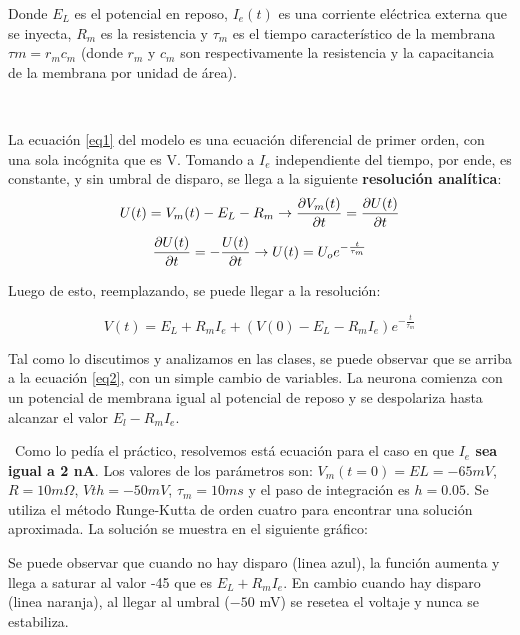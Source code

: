 \documentclass{article}
\begin{document}
Donde $E_{L}$ es el potencial en reposo, $I_{e}(t)$ es una corriente eléctrica externa que se inyecta, $R_{m}$ es la resistencia y $\tau_{m}$ es el tiempo característico de la membrana $τm = r_{m} c_{m}$ (donde  $r_{m}$ y  $c_{m}$ son respectivamente la resistencia y la capacitancia de la membrana por unidad de área).

\

La ecuación \ref{eq1} del modelo  es una ecuación diferencial de primer orden, con una sola incógnita que es V. Tomando a  \textit{$I_{e}$} independiente del tiempo, por ende, es constante, y sin umbral de disparo, se  llega a la siguiente \textbf{resolución analítica}:
\begin{equation}
\notag

U(t) = V_{m}(t) - E_{L} - R_{m}               \rightarrow 
      \frac{\partial V_{m}(t)}{\partial t} = \frac{\partial U(t)}{\partial t}
\label{eq2}
\end{equation}
\begin{equation}
\notag
\frac{\partial U(t)}{\partial t} = -\frac{U(t)}{\partial t}      \rightarrow 
     U(t) = U_{o}e^{-\frac{t}{\tau_{m}}}
\end{equation}

Luego de esto, reemplazando, se puede llegar a la resolución:

\begin{equation}
V(t) = E_{L} + R_{m}I_{e} +(V(0) -  E_{L} - R_{m}I_{e})e^{-\frac{t }{\tau_{m}}}
\label{eq2}
\end{equation}

Tal como lo discutimos y analizamos en las clases, se puede observar que se arriba a la ecuación \ref{eq2}, con un simple cambio de variables. La neurona comienza con un potencial de membrana igual al potencial de reposo y se despolariza hasta alcanzar el valor  $E_{l} - R_{m}I_{e}$.

\
Como lo pedía el práctico, resolvemos está ecuación para el caso en que\textbf{ $I_{e}$ sea igual a 2 nA}. Los valores de los parámetros son:
$V_m(t = 0) = EL = −65 mV$, $R = 10 m\Omega$, $Vth = −50 mV$, $\tau_{m} = 10 ms$ y el paso de integración es $h = 0.05$.
Se utiliza el método Runge-Kutta de orden cuatro para encontrar una solución aproximada. La solución se muestra en el siguiente gráfico:




Se puede observar que cuando no hay disparo (linea azul), la función aumenta y llega a saturar al valor -45 que es $E_L + R_mI_e$. En cambio cuando hay disparo (linea naranja), al llegar al umbral ($-50$ mV) se resetea el voltaje y nunca se estabiliza. 
\end{document}
